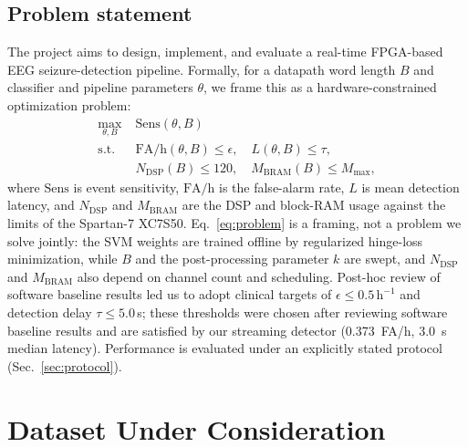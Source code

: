 \documentclass[10pt,twocolumn,letterpaper]{article}
\begin{document}
\subsection{Problem statement}
\label{sec:problem}

The project aims to design, implement, and evaluate a real-time
FPGA-based EEG seizure-detection pipeline. Formally, for a datapath word
length $B$ and classifier and pipeline parameters $\theta$, we frame this
as a hardware-constrained optimization problem:
\begin{equation}
\begin{aligned}
\max_{\theta,B}\;& \mathrm{Sens}(\theta,B)\\
\text{s.t.}\;& \mathrm{FA/h}(\theta,B)\le\epsilon,\quad L(\theta,B)\le\tau,\\
& N_{\mathrm{DSP}}(B)\le 120,\quad M_{\mathrm{BRAM}}(B)\le M_{\max},
\end{aligned}
\label{eq:problem}
\end{equation}
where $\mathrm{Sens}$ is event sensitivity, $\mathrm{FA/h}$ is the
false-alarm rate, $L$ is mean detection latency, and $N_{\mathrm{DSP}}$
and $M_{\mathrm{BRAM}}$ are the DSP and block-RAM usage against the
limits of the Spartan-7 XC7S50. Eq.~\eqref{eq:problem} is a framing, not
a problem we solve jointly: the SVM weights are trained offline by
regularized hinge-loss minimization, while $B$ and the post-processing
parameter $k$ are swept, and $N_{\mathrm{DSP}}$ and $M_{\mathrm{BRAM}}$
also depend on channel count and scheduling. Post-hoc review of software baseline results led us to adopt clinical targets of $\epsilon \le 0.5\,\text{h}^{-1}$ and
detection delay $\tau \le 5.0$\,s; these thresholds were chosen after reviewing software baseline results and are
satisfied by our streaming
detector (0.373~FA/h, 3.0~s median latency). Performance is evaluated
under an explicitly stated protocol (Sec.~\ref{sec:protocol}).

\section{Dataset Under Consideration}
\label{sec:dataset}
\end{document}
